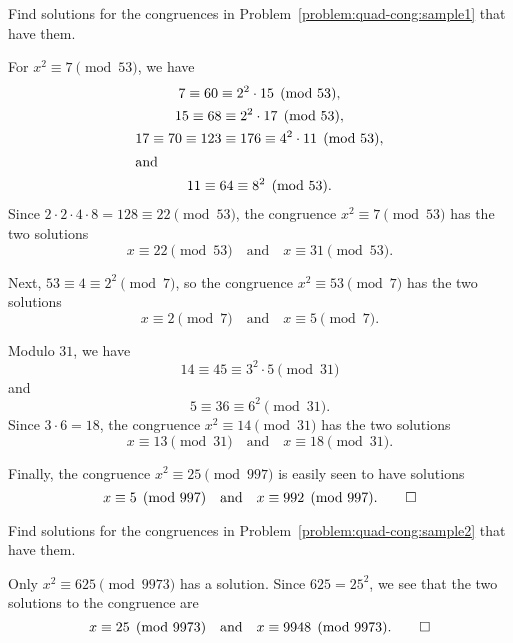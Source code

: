  Find solutions for the congruences in
Problem~\ref{problem:quad-cong:sample1} that have them.
\begin{solution}
  For $x^2\equiv7\pmod{53}$, we have
  \begin{gather*}
    7\equiv60\equiv2^2\cdot15\pmod{53}, \\
    15\equiv68\equiv2^2\cdot17\pmod{53}, \\
    17\equiv70\equiv123\equiv176\equiv4^2\cdot11\pmod{53}, \\
    \intertext{and}
    11\equiv64\equiv8^2\pmod{53}.
  \end{gather*}
  Since $2\cdot2\cdot4\cdot8 = 128\equiv22\pmod{53}$, the congruence
  $x^2\equiv7\pmod{53}$ has the two solutions
  \begin{equation*}
    x\equiv22\pmod{53}
    \quad\text{and}\quad
    x\equiv31\pmod{53}.
  \end{equation*}

  Next, $53\equiv4\equiv2^2\pmod7$, so the congruence
  $x^2\equiv53\pmod7$ has the two solutions
  \begin{equation*}
    x\equiv2\pmod7
    \quad\text{and}\quad
    x\equiv5\pmod7.
  \end{equation*}

  Modulo $31$, we have
  \begin{equation*}
    14\equiv45\equiv3^2\cdot5\pmod{31}
  \end{equation*}
  and
  \begin{equation*}
    5\equiv36\equiv6^2\pmod{31}.
  \end{equation*}
  Since $3\cdot6 = 18$, the congruence $x^2\equiv14\pmod{31}$ has the
  two solutions
  \begin{equation*}
    x\equiv13\pmod{31}
    \quad\text{and}\quad
    x\equiv18\pmod{31}.
  \end{equation*}

  Finally, the congruence $x^2\equiv25\pmod{997}$ is easily seen to
  have solutions
  \begin{equation*}
    x\equiv5\pmod{997}
    \quad\text{and}\quad
    x\equiv992\pmod{997}. \qedhere
  \end{equation*}
\end{solution}

 Find solutions for the congruences in
Problem~\ref{problem:quad-cong:sample2} that have them.
\begin{solution}
  Only $x^2\equiv625\pmod{9973}$ has a solution. Since $625 = 25^2$,
  we see that the two solutions to the congruence are
  \begin{equation*}
    x\equiv25\pmod{9973}
    \quad\text{and}\quad
    x\equiv9948\pmod{9973}. \qedhere
  \end{equation*}
\end{solution}

